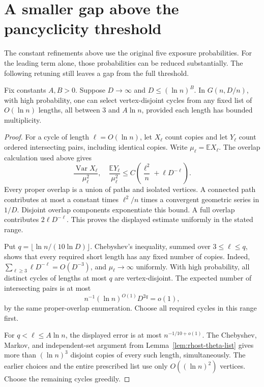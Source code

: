 \section{A smaller gap above the pancyclicity threshold}
\label{sec:rhost-threshold-retuning}

The constant refinements above use the original five exposure probabilities.
For the leading term alone, those probabilities can be reduced substantially.
The following retuning still leaves a gap from the full threshold.

\begin{lemma}\label{lem:rhost-cycle-list}
Fix constants $A,B>0$.
Suppose $D\to\infty$ and $D\le(\ln n)^B$.
In $G(n,D/n)$, with high probability, one can select vertex-disjoint cycles from any fixed list of $O(\ln n)$ lengths,
all between $3$ and $A\ln n$, provided each length has bounded multiplicity.
\end{lemma}

\begin{proof}
For a cycle of length $\ell=O(\ln n)$, let $X_\ell$ count copies and let $Y_\ell$ count ordered intersecting pairs, including identical copies.
Write $\mu_\ell=\mathbb EX_\ell$.
The overlap calculation used above gives
\[
 \frac{\operatorname{Var}X_\ell}{\mu_\ell^2},\quad
 \frac{\mathbb EY_\ell}{\mu_\ell^2}
 \le C\left(\frac{\ell^2}n+\ell D^{-\ell}\right).
\]
Every proper overlap is a union of paths and isolated vertices.
A connected path contributes at most a constant times $\ell^2/n$ times a convergent geometric series in $1/D$.
Disjoint overlap components exponentiate this bound.
A full overlap contributes $2\ell D^{-\ell}$.
This proves the displayed estimate uniformly in the stated range.

Put $q=\lfloor\ln n/(10\ln D)\rfloor$.
Chebyshev's inequality, summed over $3\le\ell\le q$, shows that every required short length has any fixed number of copies.
Indeed, $\sum_{\ell\ge3}\ell D^{-\ell}=O(D^{-3})$, and $\mu_\ell\to\infty$ uniformly.
With high probability, all distinct cycles of lengths at most $q$ are vertex-disjoint.
The expected number of intersecting pairs is at most
\[
 n^{-1}(\ln n)^{O(1)}D^{2q}=o(1),
\]
by the same proper-overlap enumeration.
Choose all required cycles in this range first.

For $q<\ell\le A\ln n$, the displayed error is at most $n^{-1/10+o(1)}$.
The Chebyshev, Markov, and independent-set argument from Lemma~\ref{lem:rhost-theta-list}
gives more than $(\ln n)^3$ disjoint copies of every such length, simultaneously.
The earlier choices and the entire prescribed list use only $O((\ln n)^2)$ vertices.
Choose the remaining cycles greedily.
\end{proof}

